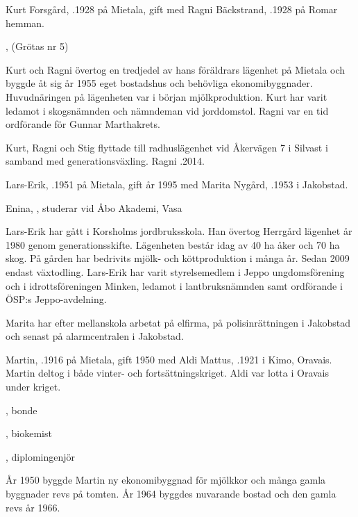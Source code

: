 Kurt Forsgård, .1928 på Mietala, gift med Ragni Bäckstrand, .1928 på Romar hemman.
\begin{jhchildren}
  \item {}, (Grötas nr 5)
  \item {}
\end{jhchildren}
Kurt och Ragni övertog en tredjedel av hans föräldrars lägenhet på Mietala och byggde åt sig år 1955 eget bostadshus och behövliga ekonomibyggnader. Huvudnäringen på lägenheten var i början mjölkproduktion. Kurt har varit ledamot i skogsnämnden och nämndeman vid jorddomstol. Ragni var en tid ordförande för Gunnar Marthakrets.

Kurt, Ragni och Stig flyttade till radhuslägenhet vid Åkervägen 7 i Silvast i samband med generationsväxling. Ragni .2014.




Lars-Erik, .1951 på Mietala, gift år 1995 med Marita Nygård, .1953 i Jakobstad.

\begin{jhchildren}
  \item Enina, , studerar vid Åbo Akademi, Vasa
\end{jhchildren}

Lars-Erik har gått i Korsholms jordbruksskola. Han övertog Herrgård	lägenhet år 1980 genom generationsskifte. Lägenheten består idag av 40 ha åker och 70 ha skog. På gården har bedrivits mjölk- och köttproduktion i många år. Sedan 2009 endast växtodling. Lars-Erik har varit styrelsemedlem i Jeppo ungdomsförening och i idrottsföreningen Minken, ledamot i lantbruksnämnden samt ordförande i ÖSP:s Jeppo-avdelning.

Marita har efter mellanskola arbetat på elfirma, på polisinrättningen i Jakobstad och senast på alarmcentralen i Jakobstad.


Martin, .1916 på Mietala, gift 1950 med Aldi  Mattus, .1921 i Kimo, Oravais. Martin deltog i både vinter- och fortsättningskriget. Aldi var lotta i Oravais under kriget.
\begin{jhchildren}
  \item {}, bonde
  \item {}, biokemist
  \item {}, diplomingenjör
\end{jhchildren}
År 1950 byggde Martin ny ekonomibyggnad för mjölkkor och många gamla byggnader revs på tomten. År 1964 byggdes nuvarande bostad och den gamla revs år 1966.

